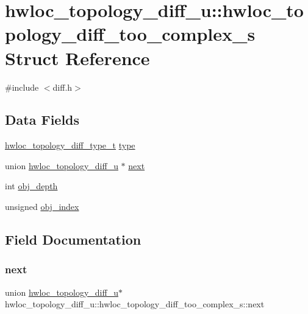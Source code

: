 \hypertarget{a00362}{}\section{hwloc\+\_\+topology\+\_\+diff\+\_\+u\+:\+:hwloc\+\_\+topology\+\_\+diff\+\_\+too\+\_\+complex\+\_\+s Struct Reference}
\label{a00362}


{\ttfamily \#include $<$diff.\+h$>$}

\subsection*{Data Fields}
\begin{DoxyCompactItemize}
\item 
\hyperlink{a00225_ga4b86adb00c8b2d09ebc4ef8f3bfd92b2}{hwloc\+\_\+topology\+\_\+diff\+\_\+type\+\_\+t} \hyperlink{a00362_a92084295a4d6faf17a95a7eea526ddbd}{type}
\item 
union \hyperlink{a00350}{hwloc\+\_\+topology\+\_\+diff\+\_\+u} $\ast$ \hyperlink{a00362_a375afbaa043b109be689a7d9a3c7d153}{next}
\item 
int \hyperlink{a00362_a94c6498caeaafbb79927395d918d6cb3}{obj\+\_\+depth}
\item 
unsigned \hyperlink{a00362_a6dc6b3c4adb10db74d993e37afaa0580}{obj\+\_\+index}
\end{DoxyCompactItemize}


\subsection{Field Documentation}
\mbox{\label{a00362_a375afbaa043b109be689a7d9a3c7d153}} 
\subsubsection{\texorpdfstring{next}{next}}
{\footnotesize\ttfamily union \hyperlink{a00350}{hwloc\+\_\+topology\+\_\+diff\+\_\+u}$\ast$ hwloc\+\_\+topology\+\_\+diff\+\_\+u\+::hwloc\+\_\+topology\+\_\+diff\+\_\+too\+\_\+complex\+\_\+s\+::next}

